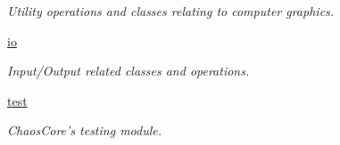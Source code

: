 \begin{DoxyCompactItemize}
\begin{DoxyCompactList}\small\item\em Utility operations and classes relating to computer graphics. \end{DoxyCompactList}\item 
\hyperlink{namespacechaos_1_1io}{io}
\begin{DoxyCompactList}\small\item\em Input/\-Output related classes and operations. \end{DoxyCompactList}\item 
\hyperlink{namespacechaos_1_1test}{test}
\begin{DoxyCompactList}\small\item\em Chaos\-Core's testing module. \end{DoxyCompactList}\end{DoxyCompactItemize}
